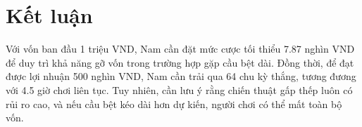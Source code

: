\documentclass[a4paper,12pt]{article}
\begin{document}
\section{Kết luận}
Với vốn ban đầu 1 triệu VND, Nam cần đặt mức cược tối thiểu 7.87 nghìn VND để duy trì khả năng gỡ vốn trong trường hợp gặp cầu bệt dài. Đồng thời, để đạt được lợi nhuận 500 nghìn VND, Nam cần trải qua 64 chu kỳ thắng, tương đương với 4.5 giờ chơi liên tục. Tuy nhiên, cần lưu ý rằng chiến thuật gấp thếp luôn có rủi ro cao, và nếu cầu bệt kéo dài hơn dự kiến, người chơi có thể mất toàn bộ vốn.
\end{document}
